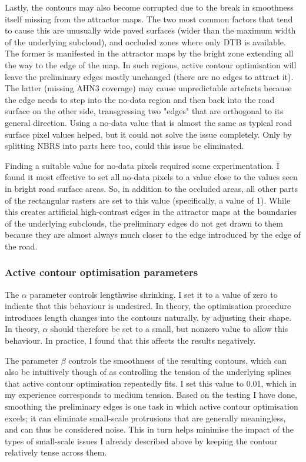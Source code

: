 Lastly, the contours may also become corrupted due to the break in smoothness itself missing from the attractor maps. The two most common factors that tend to cause this are unusually wide paved surfaces (wider than the maximum width of the underlying subcloud), and occluded zones where only DTB is available. The former is manifested in the attractor maps by the bright zone extending all the way to the edge of the map. In such regions, active contour optimisation will leave the preliminary edges mostly unchanged (there are no edges to attract it). The latter (missing AHN3 coverage) may cause unpredictable artefacts because the edge needs to step into the no-data region and then back into the road surface on the other side, transgressing two "edges" that are orthogonal to its general direction. Using a no-data value that is almost the same as typical road surface pixel values helped, but it could not solve the issue completely. Only by splitting NBRS into parts here too, could this issue be eliminated.

Finding a suitable value for no-data pixels required some experimentation. I found it most effective to set all no-data pixels to a value close to the values seen in bright road surface areas. So, in addition to the occluded areas, all other parts of the rectangular rasters are set to this value (specifically, a value of 1). While this creates artificial high-contrast edges in the attractor maps at the boundaries of the underlying subclouds, the preliminary edges do not get drawn to them because they are almost always much closer to the edge introduced by the edge of the road.

\subsubsection{Active contour optimisation parameters}

The $\alpha$ parameter controls lengthwise shrinking. I set it to a value of zero to indicate that this behaviour is undesired. In theory, the optimisation procedure introduces length changes into the contours naturally, by adjusting their shape. In theory, $\alpha$ should therefore be set to a small, but nonzero value to allow this behaviour. In practice, I found that this affects the results negatively.

The parameter $\beta$ controls the smoothness of the resulting contours, which can also be intuitively though of as controlling the tension of the underlying splines that active contour optimisation repeatedly fits. I set this value to 0.01, which in my experience corresponds to medium tension. Based on the testing I have done, smoothing the preliminary edges is one task in which active contour optimisation excels; it can eliminate small-scale protrusions that are generally meaningless, and can thus be considered noise. This in turn helps minimise the impact of the types of small-scale issues I already described above by keeping the contour relatively tense across them. 

